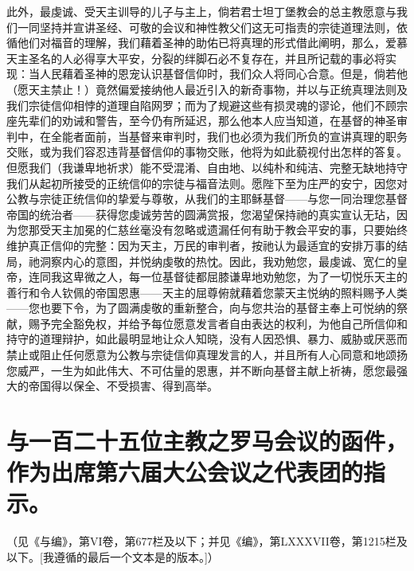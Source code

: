 此外，最虔诚、受天主训导的儿子与主上，倘若君士坦丁堡教会的总主教愿意与我们一同坚持并宣讲圣经、可敬的会议和神性教父们这无可指责的宗徒道理法则，依循他们对福音的理解，我们藉着圣神的助佑已将真理的形式借此阐明，那么，爱慕天主圣名的人必得享大平安，分裂的绊脚石必不复存在，并且所记载的事必将实现：当人民藉着圣神的恩宠认识基督信仰时，我们众人将同心合意。但是，倘若他（愿天主禁止！）竟然偏爱接纳他人最近引入的新奇事物，并以与正统真理法则及我们宗徒信仰相悖的道理自陷网罗；而为了规避这些有损灵魂的谬论，他们不顾宗座先辈们的劝诫和警告，至今仍有所延迟，那么他本人应当知道，在基督的神圣审判中，在全能者面前，当基督来审判时，我们也必须为我们所负的宣讲真理的职务交账，或为我们容忍违背基督信仰的事物交账，他将为如此藐视付出怎样的答复。但愿我们（我谦卑地祈求）能不受混淆、自由地、以纯朴和纯洁、完整无缺地持守我们从起初所接受的正统信仰的宗徒与福音法则。愿陛下至为庄严的安宁，因您对公教与宗徒正统信仰的挚爱与尊敬，从我们的主耶稣基督——与您一同治理您基督帝国的统治者——获得您虔诚劳苦的圆满赏报，您渴望保持祂的真实宣认无玷，因为您那受天主加冕的仁慈丝毫没有忽略或遗漏任何有助于教会平安的事，只要始终维护真正信仰的完整：因为天主，万民的审判者，按祂认为最适宜的安排万事的结局，祂洞察内心的意图，并悦纳虔敬的热忱。因此，我劝勉您，最虔诚、宽仁的皇帝，连同我这卑微之人，每一位基督徒都屈膝谦卑地劝勉您，为了一切悦乐天主的善行和令人钦佩的帝国恩惠——天主的屈尊俯就藉着您蒙天主悦纳的照料赐予人类——您也要下令，为了圆满虔敬的重新整合，向与您共治的基督主奉上可悦纳的祭献，赐予完全豁免权，并给予每位愿意发言者自由表达的权利，为他自己所信仰和持守的道理辩护，如此最明显地让众人知晓，没有人因恐惧、暴力、威胁或厌恶而禁止或阻止任何愿意为公教与宗徒信仰真理发言的人，并且所有人心同意和地颂扬您威严，一生为如此伟大、不可估量的恩惠，并不断向基督主献上祈祷，愿您最强大的帝国得以保全、不受损害、得到高举。\par


\section{与一百二十五位主教之罗马会议的函件，作为出席第六届大公会议之代表团的指示。}

（见《与编》，第VI卷，第677栏及以下；并见《编》，第LXXXVII卷，第1215栏及以下。[我遵循的最后一个文本是的版本。]）\par

